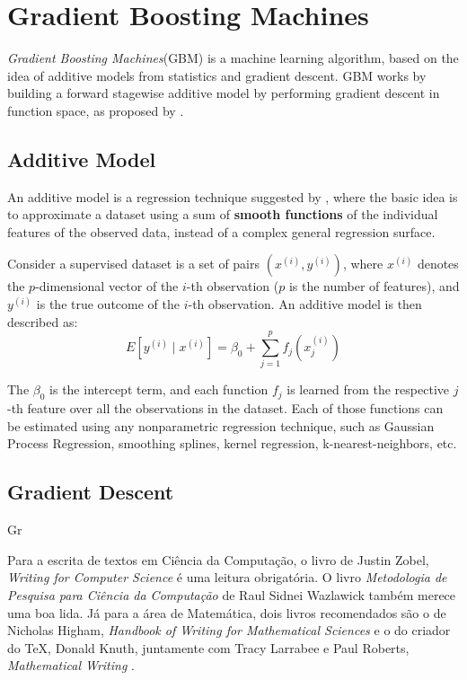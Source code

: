 \chapter{Gradient Boosting Machines}
\label{cap:boosting-intro}

\textit{Gradient Boosting Machines}(GBM) is a machine learning algorithm, based on the idea of additive models from statistics and gradient descent. GBM works by building a forward stagewise additive model 
by performing gradient descent in function space, as proposed by \cite{gbmdef}.

\section{Additive Model}
An additive model is a  regression technique suggested by , where the basic idea is to approximate a dataset using a sum of \textbf{smooth functions} of the individual features of the observed data, instead of a complex general regression surface.

Consider a supervised dataset is a set of pairs $(x^{(i)}, y^{(i)})$, where $x^{(i)}$ denotes the $p$-dimensional vector of the $i$-th observation ($p$ is the number of features), and $y^{(i)}$ is the true outcome of the $i$-th observation. An additive model is then described as:
$$E[y^{(i)}\mid x^{(i)}] = \beta_0 + \sum_{j=1}^pf_j(x^{(i)}_j)$$

The $\beta_0$ is the intercept term, and each function $f_j$ is learned from the respective $j$-th feature over all the observations in the dataset. Each of those functions can be estimated using any nonparametric regression technique, such as Gaussian Process Regression, smoothing splines, kernel regression, k-nearest-neighbors, etc.

\section{Gradient Descent}

Gr


Para a escrita de textos em Ciência da Computação, o livro de Justin Zobel, 
\emph{Writing for Computer Science} \cite{zobel:04} é uma leitura obrigatória. 
O livro \emph{Metodologia de Pesquisa para Ciência da Computação} de 
Raul Sidnei Wazlawick \cite{waz:09} também merece uma boa lida.
Já para a área de Matemática, dois livros recomendados são o de Nicholas Higham,
\emph{Handbook of Writing for Mathematical Sciences} \cite{Higham:98} e o do criador
do \TeX, Donald Knuth, juntamente com Tracy Larrabee e Paul Roberts, 
\emph{Mathematical Writing} \cite{Knuth:96}.

